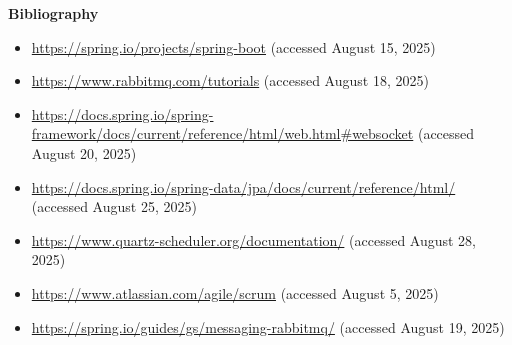 \vspace*{1cm}
\begin{center}
    \textbf{\huge{Bibliography}}
\end{center}

\vspace*{0.5cm}

\begin{itemize}
    \item \url{https://spring.io/projects/spring-boot} (accessed August 15, 2025)
    
    \item \url{https://www.rabbitmq.com/tutorials} (accessed August 18, 2025)

    \item \url{https://docs.spring.io/spring-framework/docs/current/reference/html/web.html#websocket} (accessed August 20, 2025)

    \item \url{https://docs.spring.io/spring-data/jpa/docs/current/reference/html/} (accessed August 25, 2025)

    \item \url{https://www.quartz-scheduler.org/documentation/} (accessed August 28, 2025)

    \item \url{https://www.atlassian.com/agile/scrum} (accessed August 5, 2025)

    \item \url{https://spring.io/guides/gs/messaging-rabbitmq/} (accessed August 19, 2025)

\end{itemize}